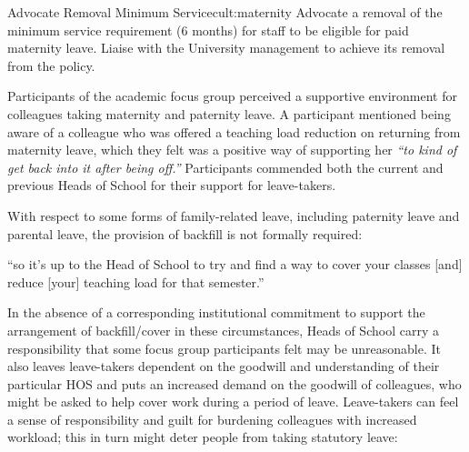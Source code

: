 

\newcommand{\actcultmaternity}{Advocate a removal of the minimum service requirement (6 months) for staff to be eligible for paid maternity leave. Liaise with the University management to achieve its removal from the policy.}
\begin{actionblock}{\ksspace{}Advocate Removal Minimum Service}{cult:maternity}
\actcultmaternity
\hfill{
    \hypersetup{hidelinks}
    \hyperlink{e3}{\gotoactionsymbol{}}
}
\end{actionblock}

Participants  of the academic focus group perceived a supportive environment for colleagues taking maternity and paternity leave. A participant mentioned being aware of a colleague who was offered a teaching load reduction on returning from maternity leave, which they felt was a positive way of supporting her \textit{``to kind of get back into it after being off.''}   Participants commended both the current and previous Heads of School for their support for leave-takers. %

With respect to some forms of family-related leave, including paternity leave and parental leave, the provision of backfill is not formally required:
\begin{myquote}
    ``so it's up to the Head of School to try and find a way to cover your classes [and] reduce [your] teaching load for that semester.''
\end{myquote}
In the absence of a corresponding institutional commitment to support the arrangement of backfill/cover in these circumstances, Heads of School carry a responsibility that some focus group participants felt may be unreasonable.  It also leaves leave-takers dependent on the goodwill and understanding of their particular \ac{HOS} and puts an increased demand on the goodwill of colleagues, who might be asked to help cover work during a period of leave.  
Leave-takers can feel a sense of responsibility and guilt for burdening colleagues with increased workload; this in turn might deter people from taking statutory leave:    



